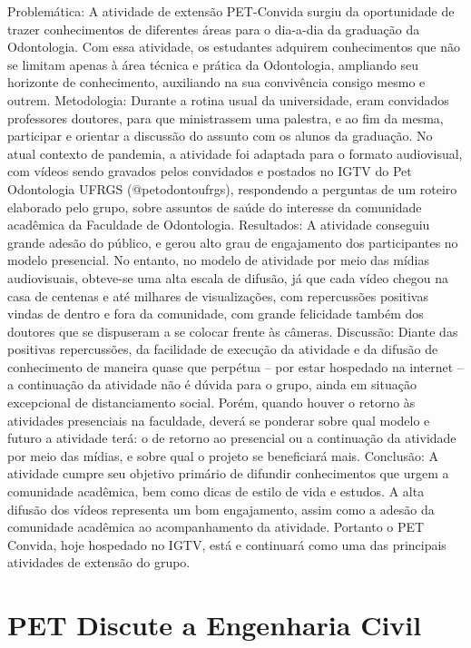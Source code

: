 Problemática: A atividade de extensão PET-Convida surgiu da oportunidade de trazer 
conhecimentos de diferentes áreas para o dia-a-dia da graduação da Odontologia. Com essa 
atividade, os estudantes adquirem conhecimentos que não se limitam apenas à área técnica e 
prática da Odontologia, ampliando seu horizonte de conhecimento, auxiliando na sua convivência 
consigo mesmo e outrem. 
Metodologia: Durante a rotina usual da universidade, eram convidados professores doutores, para 
que ministrassem uma palestra, e ao fim da mesma, participar e orientar a discussão do assunto 
com os alunos da graduação. No atual contexto de pandemia, a atividade foi adaptada para o 
formato audiovisual, com vídeos sendo gravados pelos convidados e postados no IGTV do Pet 
Odontologia UFRGS (@petodontoufrgs), respondendo a perguntas de um roteiro elaborado pelo 
grupo, sobre assuntos de saúde do interesse da comunidade acadêmica da Faculdade de 
Odontologia. 
Resultados: A atividade conseguiu grande adesão do público, e gerou alto grau de engajamento 
dos participantes no modelo presencial. No entanto, no modelo de atividade por meio das mídias 
audiovisuais, obteve-se uma alta escala de difusão, já que cada vídeo chegou na casa de centenas 
e até milhares de visualizações, com repercussões positivas vindas de dentro e fora da comunidade, 
com grande felicidade também dos doutores que se dispuseram a se colocar frente às câmeras. 
Discussão: Diante das positivas repercussões, da facilidade de execução da atividade e da difusão 
de conhecimento de maneira quase que perpétua – por estar hospedado na internet – a continuação 
da atividade não é dúvida para o grupo, ainda em situação excepcional de distanciamento social. 
Porém, quando houver o retorno às atividades presenciais na faculdade, deverá se ponderar sobre 
qual modelo e futuro a atividade terá: o de retorno ao presencial ou a continuação da atividade por 
meio das mídias, e sobre qual o projeto se beneficiará mais. 
Conclusão: A atividade cumpre seu objetivo primário de difundir conhecimentos que urgem a 
comunidade acadêmica, bem como dicas de estilo de vida e estudos. A alta difusão dos vídeos 
representa um bom engajamento, assim como a adesão da comunidade acadêmica ao 
acompanhamento da atividade. Portanto o PET Convida, hoje hospedado no IGTV, está e 
continuará como uma das principais atividades de extensão do grupo.



\section{PET Discute a Engenharia Civil}


